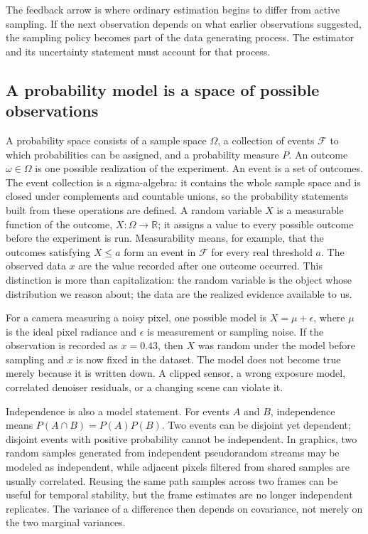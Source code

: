 The feedback arrow is where ordinary estimation begins to differ from active sampling. If the next observation depends on what earlier observations suggested, the sampling policy becomes part of the data generating process. The estimator and its uncertainty statement must account for that process.

\subsection{A probability model is a space of possible observations}\label{03-visual-computing-i-ch012-a-probability-model-is-a-space-of-possible-observations}

\hypertarget{03-visual-computing-i-ch012-a-probability-model-is-a-space-of-possible-observations}{}

A probability space consists of a sample space \(\Omega\), a collection of events \(\mathcal F\) to which probabilities can be assigned, and a probability measure \(P\). An outcome \(\omega\in\Omega\) is one possible realization of the experiment. An event is a set of outcomes. The event collection is a sigma-algebra: it contains the whole sample space and is closed under complements and countable unions, so the probability statements built from these operations are defined. A random variable \(X\) is a measurable function of the outcome, \(X:\Omega\to\mathbb R\); it assigns a value to every possible outcome before the experiment is run. Measurability means, for example, that the outcomes satisfying \(X\le a\) form an event in \(\mathcal F\) for every real threshold \(a\). The observed data \(x\) are the value recorded after one outcome occurred. This distinction is more than capitalization: the random variable is the object whose distribution we reason about; the data are the realized evidence available to us.

For a camera measuring a noisy pixel, one possible model is \(X=\mu+\epsilon\), where \(\mu\) is the ideal pixel radiance and \(\epsilon\) is measurement or sampling noise. If the observation is recorded as \(x=0.43\), then \(X\) was random under the model before sampling and \(x\) is now fixed in the dataset. The model does not become true merely because it is written down. A clipped sensor, a wrong exposure model, correlated denoiser residuals, or a changing scene can violate it.

Independence is also a model statement. For events \(A\) and \(B\), independence means \(P(A\cap B)=P(A)P(B)\). Two events can be disjoint yet dependent; disjoint events with positive probability cannot be independent. In graphics, two random samples generated from independent pseudorandom streams may be modeled as independent, while adjacent pixels filtered from shared samples are usually correlated. Reusing the same path samples across two frames can be useful for temporal stability, but the frame estimates are no longer independent replicates. The variance of a difference then depends on covariance, not merely on the two marginal variances.

